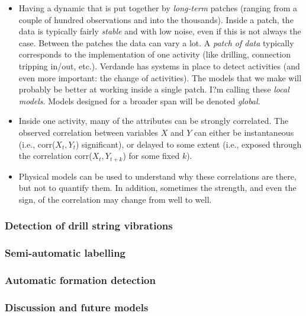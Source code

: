 \begin{itemize}

\item Having a dynamic that is put together by \emph{long-term} patches (ranging from a couple of hundred observations and into the thousands). Inside a patch, the data is typically fairly \emph{stable} and with low noise, even if this is not always the case. Between the patches the data can vary a lot. A \emph{patch of data} typically corresponds to the implementation of one activity (like drilling, connection tripping in/out, etc.). Verdande has systems in place to detect activities (and even more important: the change of activities). The models that we make will probably be better at working inside a single patch. I?m calling these \emph{local models}. Models designed for a broader span will be denoted \emph{global}.

\item Inside one activity, many of the attributes can be strongly correlated. The observed correlation between variables $X$ and $Y$ can either be instantaneous (i.e., corr($X_t, Y_t$) significant), or delayed to some extent (i.e., exposed through the correlation corr($X_t, Y_{t+k}$) for some fixed $k$).

\item Physical models can be used to understand why these correlations are there, but not to quantify them. In addition, sometimes the strength, and even the sign, of the correlation may change from well to well.

\end{itemize}


\subsubsection{Detection of drill string vibrations}


\subsubsection{Semi-automatic labelling}


\subsubsection{Automatic formation detection}


\subsubsection{Discussion and future models}

